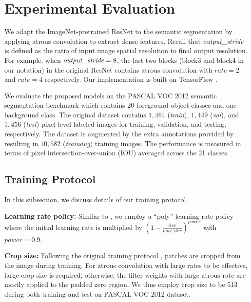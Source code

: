 \section{Experimental Evaluation}
\label{sec:experiments}
We adapt the ImageNet-pretrained \cite{ILSVRC15} ResNet \cite{he2015deep} to the semantic segmentation by applying atrous convolution to extract dense features. Recall that \emph{output\_stride} is defined as the ratio of input image spatial resolution to final output resolution. For example, when $\emph{output\_stride}=8$, the last two blocks (block3 and block4 in our notation) in the original ResNet contains atrous convolution with $rate=2$ and $rate=4$ respectively. Our implementation is built on TensorFlow \cite{abadi2016tensorflow}.

We evaluate the proposed models on the PASCAL VOC 2012 semantic segmentation benchmark \cite{everingham2014pascal} which contains 20 foreground object classes and one background class. The original dataset contains $1,464$ (\textit{train}), $1,449$ (\textit{val}), and $1,456$ (\textit{test}) pixel-level labeled
images for training, validation, and testing, respectively. The dataset is
augmented by the extra annotations provided by \cite{hariharan2011semantic},
resulting in $10,582$ (\textit{trainaug}) training images. The performance
is measured in terms of pixel intersection-over-union (IOU) averaged across
the 21 classes.

\subsection{Training Protocol}
\label{subsec:train_protocol}
In this subsection, we discuss details of our training protocol.

\textbf{Learning rate policy:} Similar to \cite{liu2015parsenet, chen2016deeplab}, we employ a ``poly'' learning rate policy where the initial learning rate is multiplied by $(1-\frac{iter}{max\_iter})^{power}$ with $power = 0.9$.

\textbf{Crop size:} Following the original training protocol \cite{chen2014semantic, chen2016deeplab}, patches are cropped from the image during training. For atrous convolution with large rates to be effective, large crop size is required; otherwise, the filter weights with large atrous rate are mostly applied to the padded zero region. We thus employ crop size to be 513 during both training and test on PASCAL VOC 2012 dataset.

